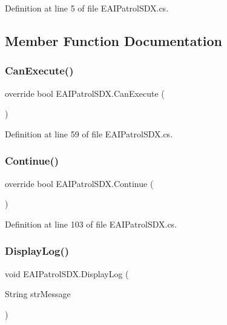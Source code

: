 Definition at line 5 of file E\+A\+I\+Patrol\+S\+D\+X.\+cs.



\subsection{Member Function Documentation}
\mbox{\label{class_e_a_i_patrol_s_d_x_a9039242e863a0e5a0381c01d4204487f}} 
\subsubsection{\texorpdfstring{CanExecute()}{CanExecute()}}
{\footnotesize\ttfamily override bool E\+A\+I\+Patrol\+S\+D\+X.\+Can\+Execute (\begin{DoxyParamCaption}{ }\end{DoxyParamCaption})}



Definition at line 59 of file E\+A\+I\+Patrol\+S\+D\+X.\+cs.

\mbox{\label{class_e_a_i_patrol_s_d_x_a1adab2eea226eb846a0fe918e9032fcf}} 
\subsubsection{\texorpdfstring{Continue()}{Continue()}}
{\footnotesize\ttfamily override bool E\+A\+I\+Patrol\+S\+D\+X.\+Continue (\begin{DoxyParamCaption}{ }\end{DoxyParamCaption})}



Definition at line 103 of file E\+A\+I\+Patrol\+S\+D\+X.\+cs.

\mbox{\label{class_e_a_i_patrol_s_d_x_a52cbc47fa43745d8429bfc1e96635103}} 
\subsubsection{\texorpdfstring{DisplayLog()}{DisplayLog()}}
{\footnotesize\ttfamily void E\+A\+I\+Patrol\+S\+D\+X.\+Display\+Log (\begin{DoxyParamCaption}\item[{String}]{str\+Message }\end{DoxyParamCaption})}



